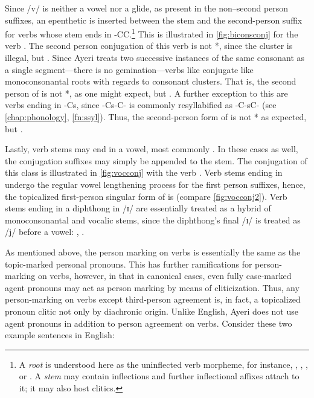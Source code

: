 Since /v/ is neither a vowel nor a glide, as present in the non--second person
suffixes, an epenthetic  is inserted between the stem and the 
second-person suffix for verbs whose stem ends in -CC.\footnote{A \emph{root} is
understood here as the uninflected verb morpheme, for instance,
, , , or .
A \emph{stem} may contain inflections and further inflectional affixes attach
to it; it may also host clitics.} This is illustrated in
\autoref{fig:biconsconj} for the verb . The second
person conjugation of this verb is not *, since the
cluster  is illegal, but . Since Ayeri treats
two successive instances of the same consonant as a single segment---there is
no gemination---verbs like  conjugate like
monoconsonantal roots with regards to consonant clusters. That is, the second
person of  is not *, as one might
expect, but . A further exception to this are verbs
ending in -Cs, since -Cs-C- is commonly resyllabified as -C-sC- (see
\autoref{chap:phonology}, \autoref{fn:ssyl}). Thus, the second-person form of
 is not * as expected, but
.

Lastly, verb stems may end in a vowel, most commonly . In these cases
as well, the conjugation suffixes may simply be appended to the stem. The
conjugation of this class is illustrated in \autoref{fig:vocconj} with the
verb . Verb stems ending in  undergo the regular
vowel lengthening process for the first person suffixes, hence, the
topicalized first-person singular form of  is
 (compare \autoref{fig:vocconj2}). Verb stems
ending in a diphthong in /ɪ/ are essentially treated as a hybrid of
monoconsonantal and vocalic stems, since the diphthong's final /ɪ/ is treated
as /j/ before a vowel: ,
.

As mentioned above, the person marking on verbs is essentially the same as the
topic-marked personal pronouns. This has further ramifications for
person-marking on verbs, however, in that in canonical cases, even fully
case-marked agent pronouns may act as person marking by means of cliticization.
Thus, any person-marking on verbs except third-person agreement is, in fact, a
topicalized pronoun clitic not only by diachronic origin. Unlike English, Ayeri
does not use agent pronouns in addition to person agreement on verbs. Consider
these two example sentences in English:

